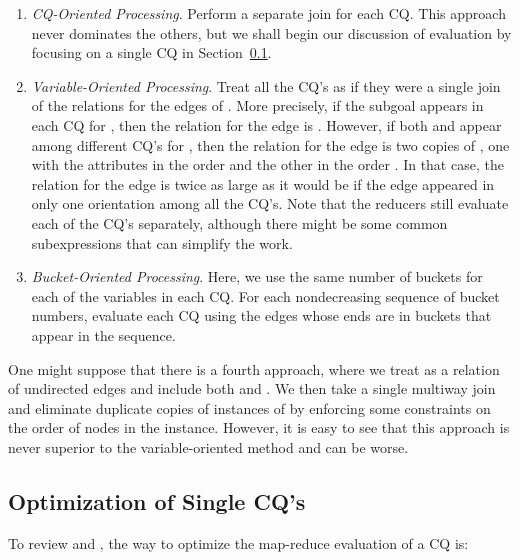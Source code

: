\begin{enumerate}
\item {\em CQ-Oriented Processing}. Perform a separate join for each CQ.  This approach never dominates the others, but we shall begin our discussion of evaluation by focusing on a single CQ in Section~\ref{1-cq-opt-subsect}.

\item {\em Variable-Oriented Processing}. Treat all the CQ's as if they were a single join of the relations for the edges of .  More precisely, if the subgoal  appears in each CQ for , then the relation for the edge  is .  However, if both  and  appear among different CQ's for , then the relation for the edge  is two copies of , one with the attributes in the order  and the other in the order .  In that case, the relation for the edge  is twice as large as it would be if the edge appeared in only one orientation among all the CQ's.  Note that the reducers still evaluate each of the CQ's separately, although there might be some common subexpressions that can simplify the work.

\item {\em Bucket-Oriented Processing}. Here, we use the same number of buckets for each of the variables in each CQ. For each nondecreasing sequence of bucket numbers, evaluate each CQ using the edges whose ends are in buckets that appear in the sequence.
\end{enumerate}
One might suppose that there is a fourth approach, where we treat  as a relation of undirected edges and include both  and .  We then take a single multiway join and eliminate duplicate copies of instances of  by enforcing some constraints on the order of nodes in the instance.  However, it is easy to see that this approach is never superior to the variable-oriented method and can be worse.




\subsection{Optimization of Single CQ's}
\label{1-cq-opt-subsect}

To review \cite{AU10} and \cite{AU11-Datalog2.0}, the way to optimize the map-reduce evaluation of a CQ is:

